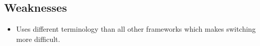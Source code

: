 \subsection{Weaknesses}
\label{subsec:angular:weaknesses}
\begin{itemize}
    \item Uses different terminology than all other frameworks which makes switching more difficult.
\end{itemize}